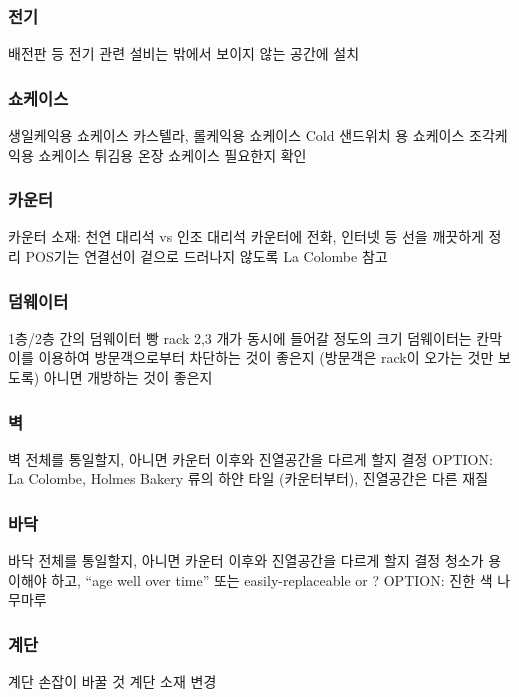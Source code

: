 \documentclass{myproc}
\begin{document}
\subsubsection{전기}
\bit
\w 배전판 등 전기 관련 설비는 밖에서 보이지 않는 공간에 설치
\eit

\subsubsection{쇼케이스}
\bit
\w 생일케익용 쇼케이스
\w 카스텔라, 롤케익용 쇼케이스
\w Cold 샌드위치 용 쇼케이스
\w 조각케익용 쇼케이스
\w 튀김용 \textcolor{red2}{온장 쇼케이스} 필요한지 확인
\eit

\subsubsection{카운터}
\bit
\w 카운터 소재: 천연 대리석 vs 인조 대리석
\w 카운터에 전화, 인터넷 등 선을 깨끗하게 정리
\w POS기는 연결선이 겉으로 드러나지 않도록
\w \textcolor{blue2}{La Colombe} 참고
\eit

\subsubsection{덤웨이터}
\bit
\w 1층/2층 간의 덤웨이터
\w 빵 rack 2,3 개가 동시에 들어갈 정도의 크기
\w 덤웨이터는 칸막이를 이용하여 방문객으로부터 차단하는 것이 좋은지  (방문객은
rack이 오가는 것만 보도록) 아니면 개방하는 것이 좋은지
\eit

\subsubsection{벽}
\bit
\w 벽 전체를 통일할지, 아니면 카운터 이후와 진열공간을 다르게 할지 결정
\w OPTION: La Colombe, Holmes Bakery 류의 하얀 타일  (카운터부터), 진열공간은
다른 재질
\eit

\subsubsection{바닥}
\bit
\w 바닥 전체를 통일할지, 아니면 카운터 이후와 진열공간을 다르게 할지 결정
\w 청소가 용이해야 하고, ``age well over time'' 또는 easily-replaceable or ?
\w OPTION: 진한 색 나무마루
\eit

\subsubsection{계단}
\bit
\w 계단 손잡이 바꿀 것
\w 계단 소재 변경
\eit
\end{document}
